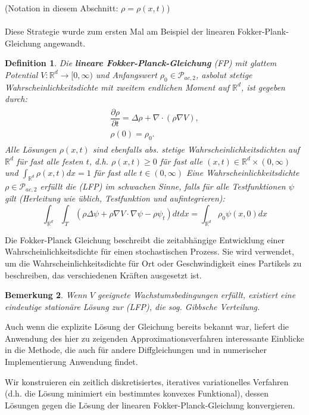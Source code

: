 \documentclass[11pt,a4paper,notitlepage]{scrreprt}
\newcommand{\RR}{\mathbb{R}}
\newtheorem{defi}{Definition}[section]
\newtheorem{bem}[defi]{Bemerkung}
\begin{document}
(Notation in diesem Abschnitt: $\rho=\rho(x,t)$)\\\\
Diese Strategie wurde zum ersten Mal am Beispiel der linearen Fokker-Plank-Gleichung angewandt. \\
\begin{defi}
Die \textbf{lineare Fokker-Planck-Gleichung} (FP) mit glattem Potential $V:\RR^d\to[0,\infty)$ und Anfangswert $\rho_0\in\mathcal{P}_{ac,2}$, asbolut stetige Wahrscheinlichkeitsdichte mit zweitem endlichen Moment auf $\RR^d$, ist gegeben durch:
\begin{eqnarray}
\begin{split}
\dfrac{\partial\rho}{\partial t}=\Delta\rho+\nabla\cdot(\rho\nabla V),\\
\rho(0)=\rho_0.\label{FP}
\end{split}
\end{eqnarray}
Alle Lösungen $\rho(x,t)$ sind ebenfalls abs. stetige Wahrscheinlichkeitsdichten auf $\RR^d$ für fast alle festen $t$, d.h. $\rho(x,t)\geq 0$ für fast alle $(x,t)\in \RR^d\times(0,\infty)$  und $\int_{\RR^d}\rho(x,t)dx=1$ für fast alle $t\in(0,\infty)$
Eine Wahrscheinlichkeitsdichte $\rho\in\mathcal{P}_{ac,2}$ erfüllt die (LFP) im schwachen Sinne, falls für alle Testfunktionen $\psi$ gilt (Herleitung wie üblich, Testfunktion und aufintegrieren):
\begin{equation}
\int_{\RR^d} \int_T (\rho\Delta\psi+\rho\nabla V\cdot\nabla\psi -\rho\psi_t) dt dx=\int_{\RR^d}\rho_0\psi(x,0)dx \label{FPweak}
\end{equation}
\end{defi}

Die Fokker-Planck Gleichung beschreibt die zeitabhängige Entwicklung einer Wahrscheinlichkeitsdichte für einen stochastischen Prozess. Sie wird verwendet, um die Wahrscheinlichkeitsdichte für Ort oder Geschwindigkeit eines Partikels zu beschreiben, das verschiedenen Kräften ausgesetzt ist.

\begin{bem}
Wenn $V$ geeignete Wachstumsbedingungen erfüllt, existiert eine eindeutige stationäre Lösung zur (LFP), die sog. Gibbsche Verteilung.
\end{bem}
Auch wenn die explizite Lösung der Gleichung bereits bekannt war, liefert die Anwendung des hier zu zeigenden Approximationsverfahren interessante Einblicke in die Methode, die auch für andere Diffgleichungen und in numerischer Implementierung Anwendung findet. 


Wir konstruieren ein zeitlich diskretisiertes, iteratives variationelles Verfahren (d.h. die Lösung minimiert ein bestimmtes konvexes Funktional), dessen Lösungen gegen die Lösung der linearen Fokker-Planck-Gleichung konvergieren.
\end{document}
